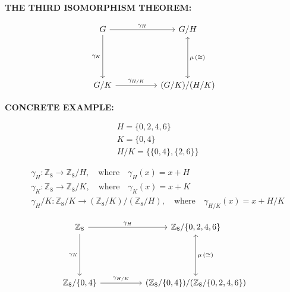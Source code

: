 \documentclass[tikz, border=5mm]{article}
\begin{document}
\newpage


\textbf{THE THIRD ISOMORPHISM THEOREM:}

\[
\begin{tikzcd}[column sep=5em,row sep=5em]
    G \arrow{r}{\gamma_H} \arrow{d}[left]{\gamma_K} & G/H \\
    G/K \arrow{r}{\gamma_{H/K}} & (G/K)/(H/K) \arrow[leftrightarrow]{u}[right]{\mu\,(\cong)} 
\end{tikzcd}
\]
 
\textbf{CONCRETE EXAMPLE:}

\begin{align*}
& H = \{0,2,4,6\} \\[3pt]
& K = \{0,4\} \\[3pt]
& H/K = \big\{ \{0,4\}, \{2,6\} \big\}
\end{align*}


\begin{align*}
& \gamma_H: \mathbb{Z}_{8} \to \mathbb{Z}_{8}/H, \quad \textrm{where} \quad \gamma_H(x) = x + H \\[3pt]
& \gamma_K: \mathbb{Z}_{8} \to \mathbb{Z}_{8}/K, \quad \textrm{where} \quad \gamma_K(x) = x + K \\[3pt]
& \gamma_H/K: \mathbb{Z}_{8}/K \to (\mathbb{Z}_{8}/K)/(\mathbb{Z}_{8}/H), \quad \textrm{where} \quad \gamma_{H/K}(x) = x + H/K
\end{align*}

\[
\begin{tikzcd}[column sep=5em,row sep=5em]
    \mathbb{Z}_{8} \arrow{r}{\gamma_H} \arrow{d}[left]{\gamma_K} & \mathbb{Z}_{8}/\{0,2,4,6\} \\
    \mathbb{Z}_{8}/\{0,4\} \arrow{r}{\gamma_{H/K}} & (\mathbb{Z}_{8}/\{0,4\})/(\mathbb{Z}_{8}/\{0,2,4,6\}) \arrow[leftrightarrow]{u}[right]{\mu\,(\cong)} 
\end{tikzcd}
\]
\end{document}
